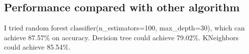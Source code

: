 \documentclass{article}
\begin{document}
\subsection{Performance compared with other algorithm}
I tried random forest classifier(n\_estimators=100, max\_depth=30), which can achieve 87.57\% on accuracy. Decision tree could achieve 79.02\%. KNeighbors could achieve 85.54\%.
\end{document}
